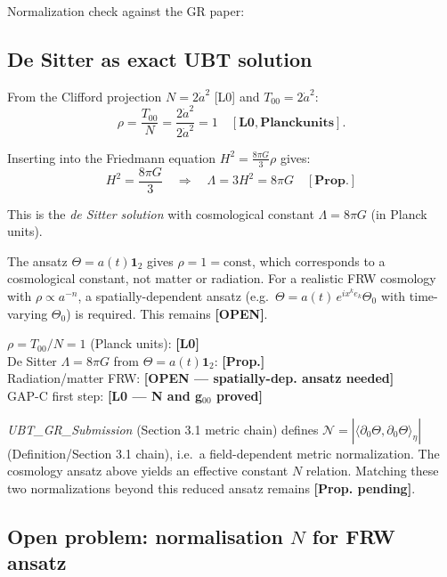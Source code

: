 \documentclass[12pt,a4paper]{article}
\begin{document}
\begin{openproblembox}
Normalization check against the GR paper:
\subsection{De Sitter as exact UBT solution}
\label{sec:desitter-exact}

From the Clifford projection $N = 2\dot a^2$ [L0] and
$T_{00} = 2\dot a^2$:
\[
\rho = \frac{T_{00}}{N} = \frac{2\dot a^2}{2\dot a^2} = 1
\quad [\mathbf{L0, Planck units}].
\]

Inserting into the Friedmann equation
$H^2 = \tfrac{8\pi G}{3}\rho$ gives:
\[
H^2 = \frac{8\pi G}{3} \quad\Rightarrow\quad
\Lambda = 3H^2 = 8\pi G \quad [\mathbf{Prop.}]
\]

This is the \emph{de Sitter solution} with cosmological constant
$\Lambda = 8\pi G$ (in Planck units).

\begin{remark}
The ansatz $\Theta = a(t)\mathbf{1}_2$ gives $\rho = 1 = \mathrm{const}$,
which corresponds to a cosmological constant, not matter or radiation.
For a realistic FRW cosmology with $\rho\propto a^{-n}$, a
spatially-dependent ansatz (e.g.\ $\Theta = a(t)\,e^{ix^k e_k}\Theta_0$
with time-varying $\Theta_0$) is required.
This remains \textbf{[OPEN]}.
\end{remark}

\begin{statusbox}
$\rho = T_{00}/N = 1$ (Planck units): \textbf{[L0]}\\
De Sitter $\Lambda = 8\pi G$ from $\Theta = a(t)\mathbf{1}_2$: \textbf{[Prop.]}\\
Radiation/matter FRW: \textbf{[OPEN — spatially-dep. ansatz needed]}\\
GAP-C first step: \textbf{[L0 — N and g$_{00}$ proved]}
\end{statusbox}
\textit{UBT\_GR\_Submission} (Section 3.1 metric chain) defines
\(\mathcal N=|\langle\partial_0\Theta,\partial_0\Theta\rangle_\eta|\)
(Definition/Section 3.1 chain), i.e.\ a field-dependent metric normalization.
The cosmology ansatz above yields an effective constant \(N\) relation.
Matching these two normalizations beyond this reduced ansatz remains
\textbf{[Prop. pending]}.

\subsection{Open problem: normalisation $N$ for FRW ansatz}
\label{sec:N-open}


\end{openproblembox}
\end{document}
